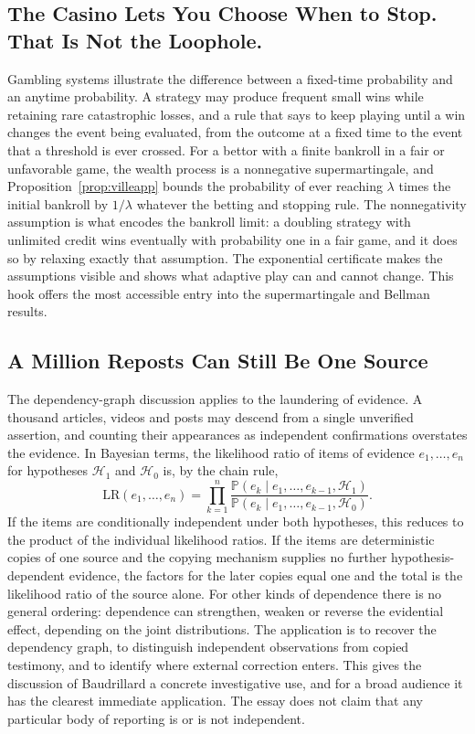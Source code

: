 \documentclass[11pt]{article}
\theoremstyle{definition}
\theoremstyle{remark}
\renewcommand{\Pr}{\mathbb{P}}
\begin{document}
\subsection{The Casino Lets You Choose When to Stop. That Is Not the Loophole.}

Gambling systems illustrate the difference between a fixed-time probability and an anytime probability. A strategy may produce frequent small wins while retaining rare catastrophic losses, and a rule that says to keep playing until a win changes the event being evaluated, from the outcome at a fixed time to the event that a threshold is ever crossed. For a bettor with a finite bankroll in a fair or unfavorable game, the wealth process is a nonnegative supermartingale, and Proposition~\ref{prop:villeapp} bounds the probability of ever reaching $\lambda$ times the initial bankroll by $1/\lambda$ whatever the betting and stopping rule. The nonnegativity assumption is what encodes the bankroll limit: a doubling strategy with unlimited credit wins eventually with probability one in a fair game, and it does so by relaxing exactly that assumption. The exponential certificate makes the assumptions visible and shows what adaptive play can and cannot change. This hook offers the most accessible entry into the supermartingale and Bellman results.

\subsection{A Million Reposts Can Still Be One Source}

The dependency-graph discussion applies to the laundering of evidence. A thousand articles, videos and posts may descend from a single unverified assertion, and counting their appearances as independent confirmations overstates the evidence. In Bayesian terms, the likelihood ratio of items of evidence $e_1, \dots, e_n$ for hypotheses $\mathcal{H}_1$ and $\mathcal{H}_0$ is, by the chain rule,
\[
\mathrm{LR}(e_1, \dots, e_n) = \prod_{k=1}^{n} \frac{\Pr(e_k \mid e_1, \dots, e_{k-1}, \mathcal{H}_1)}{\Pr(e_k \mid e_1, \dots, e_{k-1}, \mathcal{H}_0)} .
\]
If the items are conditionally independent under both hypotheses, this reduces to the product of the individual likelihood ratios. If the items are deterministic copies of one source and the copying mechanism supplies no further hypothesis-dependent evidence, the factors for the later copies equal one and the total is the likelihood ratio of the source alone. For other kinds of dependence there is no general ordering: dependence can strengthen, weaken or reverse the evidential effect, depending on the joint distributions. The application is to recover the dependency graph, to distinguish independent observations from copied testimony, and to identify where external correction enters. This gives the discussion of Baudrillard a concrete investigative use, and for a broad audience it has the clearest immediate application. The essay does not claim that any particular body of reporting is or is not independent.
\end{document}

